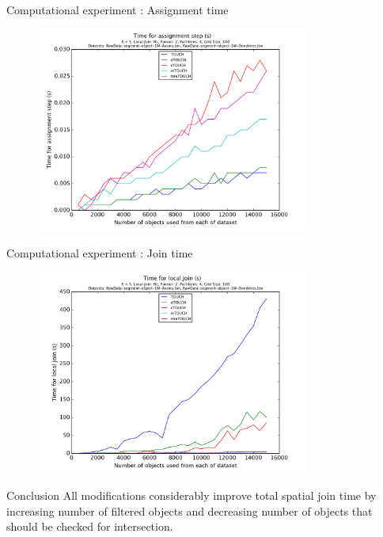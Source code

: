 \documentclass{beamer}
\begin{document}
\begin{frame}{Computational experiment : Assignment time}
\begin{figure}[p]
    \centering
    \includegraphics[width=0.8\textwidth]{Images/pic20.png}
\end{figure}
\end{frame}
\begin{frame}{Computational experiment : Join time}
\begin{figure}[p]
    \centering
    \includegraphics[width=0.8\textwidth]{Images/pic22.png}
\end{figure}
\end{frame}
\begin{frame}{Conclusion}
All modifications considerably improve total spatial join time by increasing number of filtered objects and decreasing number of objects that should be checked for intersection.
\end{frame}
\end{document}
